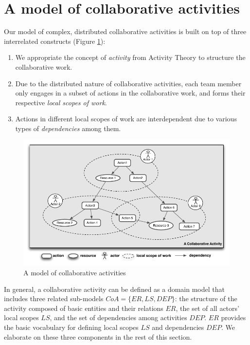 \section{A model of collaborative activities} %
\label{sec:a_model_of_collaborative_activities}
Our model of complex, distributed collaborative activities is built on top of three interrelated constructs (Figure \ref{fig:model_of_collaborative_activity}):

\begin{enumerate}
	\item We appropriate the concept of \emph{activity} from Activity Theory \cite{nardi1996context} to structure the collaborative work.
	\item Due to the distributed nature of collaborative activities, each team member only engages in a subset of actions in the collaborative work, and forms their respective \emph{local scopes of work}.
	\item Actions in different local scopes of work are interdependent due to various types of \emph{dependencies} among them.
\end{enumerate}

\begin{figure}[htbp] %
   \centering
   \includegraphics{model_of_collaborative_activity.pdf} 
   \caption{A model of collaborative activities}
   \label{fig:model_of_collaborative_activity}
\end{figure}

In general, a collaborative activity can be defined as a domain model that includes three related sub-models $CoA=\{ER, LS, DEP\}$: the structure of the activity composed of basic entities and their relations $ER$, the set of all actors' local scopes $LS$, and the set of dependencies among activities $DEP$. $ER$ provides the basic vocabulary for defining local scopes $LS$ and dependencies $DEP$. We elaborate on these three components in the rest of this section. 

